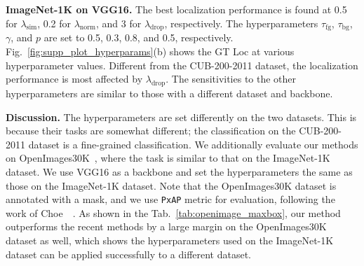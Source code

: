 \noindent\textbf{ImageNet-1K on VGG16.}
The best localization performance is found at 0.5 for $\lambda_\text{sim}$, 0.2 for $\lambda_\text{norm}$, and 3 for $\lambda_\text{drop}$, respectively. The hyperparameters $\tau_\text{fg}$, $\tau_\text{bg}$, $\gamma$, and $p$ are set to 0.5, 0.3, 0.8, and 0.5, respectively.
Fig.~\ref{fig:supp_plot_hyperparams}(b) shows the GT Loc at various hyperparameter values. Different from the CUB-200-2011 dataset, the localization performance is most affected by $\lambda_\text{drop}$. The sensitivities to the other hyperparameters are similar to those with a different dataset and backbone.



\noindent\textbf{Discussion.}
The hyperparameters are set differently on the two datasets. This is because their tasks are somewhat different; the classification on the CUB-200-2011 dataset is a fine-grained classification. We additionally evaluate our methods on OpenImages30K~\cite{benenson2019large, choe2020evaluation}, where the task is similar to that on the ImageNet-1K dataset. We use VGG16 as a backbone and set the hyperparameters the same as those on the ImageNet-1K dataset. Note that the OpenImages30K dataset is annotated with a mask, and we use \texttt{PxAP} metric for evaluation, following the work of Choe~\etal~\cite{choe2020evaluation}. As shown in the Tab.~\ref{tab:openimage_maxbox}, our method outperforms the recent methods by a large margin on the OpenImages30K dataset as well, which shows the hyperparameters used on the ImageNet-1K dataset can be applied successfully to a different dataset.

\clearpage


